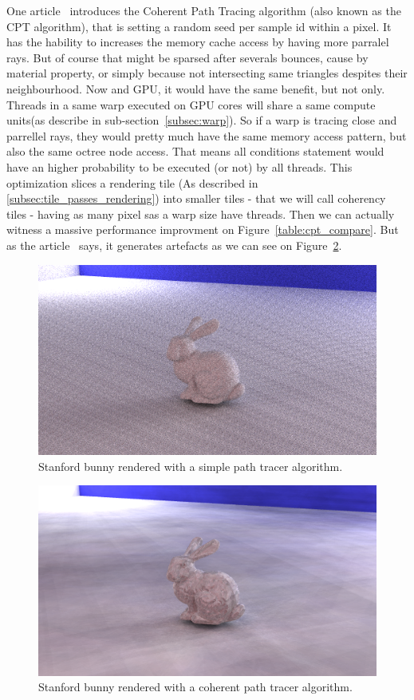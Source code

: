 One article~\cite{cpt} introduces the Coherent Path Tracing algorithm (also known
as the CPT algorithm), that is setting a
random seed per sample id within a pixel. It has the hability to increases the
memory cache access by having more parralel rays. But of course that might be
sparsed after severals bounces, cause by material property, or simply because
not intersecting same triangles despites their neighbourhood. Now and GPU, it
would have the same benefit, but not only. Threads in a same warp executed on
GPU cores will share a same compute units(as describe in sub-section~\ref{subsec:warp}). So
if a warp is tracing close and parrellel rays, they would pretty much have
the same memory access pattern, but also the same octree node access. That means
all conditions statement would have an higher probability to be executed (or not)
by all threads. This optimization slices a rendering tile (As described
in \ref{subsec:tile_passes_rendering}) into smaller tiles - that we will call
coherency tiles - having as many pixel sas a warp size have threads. Then we can
actually witness a massive performance improvment on Figure~\ref{table:cpt_compare}.
But as the article~\cite{cpt} says, it generates artefacts as we can see on
Figure~\ref{fig:stanford_bunny_cpt}.

\begin{figure}[h]
    \centering
    \includegraphics[width=0.8\columnwidth]{render_stanford_bunny_dummy.png}
    \caption{Stanford bunny rendered with a simple path tracer algorithm.}
    \label{fig:stanford_bunny_dummy}
\end{figure}

\begin{figure}[h]
    \centering
    \includegraphics[width=0.8\columnwidth]{render_stanford_bunny_cpt.png}
    \caption{Stanford bunny rendered with a coherent path tracer algorithm.}
    \label{fig:stanford_bunny_cpt}
\end{figure}

